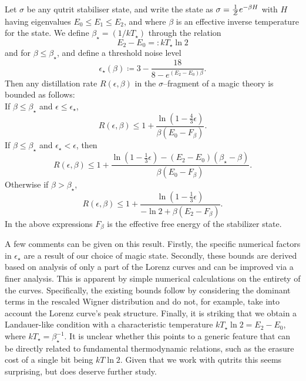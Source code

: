 \documentclass[pra,
aps,
twocolumn,
superscriptaddress,
groupedaddress,
nofootinbib,
reprint
]{revtex4-1}
\begin{document}
\begin{theorem}\label{thm:stab_bounds}
	Let $\sigma$ be any qutrit stabiliser state, and write the state as $\sigma = \frac{1}{\mathcal{Z}} e^{-\beta H}$ with $H$ having eigenvalues $E_0 \le E_1 \le E_2$, and where $\beta$ is an effective inverse temperature for the state. 
We define $\beta_\star = (1/kT_\star)$ through the relation
\begin{equation}
	E_2 - E_0 =: kT_\star \ln{2}
\end{equation}
and for $\beta \leq \beta_\star$, and define a threshold noise level
\begin{equation}
	\epsilon_{\star}(\beta) \coloneqq 3 - \dfrac{18}{8-e^{(E_2 - E_0)\beta}}.
\end{equation}
Then any distillation rate $R(\epsilon, \beta)$ in the $\sigma$--fragment of a magic theory is bounded as follows:\\
If $\beta \leq \beta_{\star}$ and $\epsilon  \leq \epsilon_{\star}$,
\begin{equation}
	R(\epsilon,\beta) \leq 1 + \frac{\ln{\left( 1 - \frac{4}{3}\epsilon \right)}}{\beta (E_0 - F_\beta)}.
\end{equation}
If $\beta \leq \beta_{\star}$ and $\epsilon_{\star} < \epsilon$, then
\begin{equation}
	R(\epsilon, \beta) \le 1 + \frac{\ln{\left(1-\frac{1}{3}\epsilon \right)} - (E_2 - E_0)(\beta_{\star} - \beta)}{\beta (E_0 - F_\beta)}.
\end{equation}
Otherwise if $\beta > \beta_{\star}$,
\begin{equation}
	R(\epsilon, \beta) \leq  1+ \frac{\ln{\left(1-\frac{1}{3}\epsilon \right)}}{-\ln{2} + \beta (E_2 - F_\beta)}.
\end{equation}
In the above expressions $F_\beta$ is the effective free energy of the stabilizer state.
\end{theorem}
A few comments can be given on this result. 
Firstly, the specific numerical factors in $\epsilon_\star$ are a result of our choice of magic state. 
Secondly, these bounds are derived based on analysis of only a part of the Lorenz curves and can be improved via a finer analysis. 
This is apparent by simple numerical calculations on the entirety of the curves.
Specifically, the existing bounds follow by considering the dominant terms in the rescaled Wigner distribution and do not, for example, take into account the Lorenz curve's peak structure. 
Finally, it is striking that we obtain a Landauer-like condition with a characteristic temperature $kT_\star \ln 2 = E_2 - E_0$, where $kT_\star = \beta_\star^{-1}$. 
It is unclear whether this points to a generic feature that can be directly related to fundamental thermodynamic relations, such as the erasure cost of a single bit being $kT \ln 2$. 
Given that we work with qutrits this seems surprising, but does deserve further study.
\end{document}
